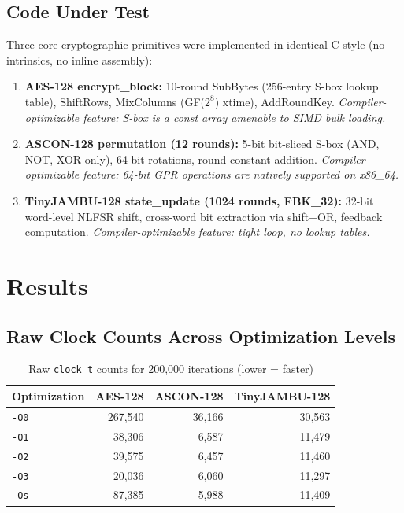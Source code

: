 \documentclass[11pt,a4paper]{article}
\begin{document}
\subsection{Code Under Test}

Three core cryptographic primitives were implemented in identical C style (no intrinsics, no inline assembly):

\begin{enumerate}[label=(\arabic*)]
    \item \textbf{AES-128 encrypt\_block:} 10-round SubBytes (256-entry S-box lookup table), ShiftRows, MixColumns (GF($2^8$) xtime), AddRoundKey. \textit{Compiler-optimizable feature: S-box is a const array amenable to SIMD bulk loading.}
    \item \textbf{ASCON-128 permutation (12 rounds):} 5-bit bit-sliced S-box (AND, NOT, XOR only), 64-bit rotations, round constant addition. \textit{Compiler-optimizable feature: 64-bit GPR operations are natively supported on x86\_64.}
    \item \textbf{TinyJAMBU-128 state\_update (1024 rounds, FBK\_32):} 32-bit word-level NLFSR shift, cross-word bit extraction via shift+OR, feedback computation. \textit{Compiler-optimizable feature: tight loop, no lookup tables.}
\end{enumerate}

\section{Results}

\subsection{Raw Clock Counts Across Optimization Levels}

\begin{table}[H]
\centering
\caption{Raw {\tt clock\_t} counts for 200,000 iterations (lower = faster)}
\label{tab:raw}
\begin{tabular}{lrrr}
\toprule
\textbf{Optimization} & \textbf{AES-128} & \textbf{ASCON-128} & \textbf{TinyJAMBU-128} \\
\midrule
{\tt -O0} & 267,540 & 36,166 & 30,563 \\
{\tt -O1} &  38,306 &  6,587 & 11,479 \\
{\tt -O2} &  39,575 &  6,457 & 11,460 \\
{\tt -O3} &  20,036 &  6,060 & 11,297 \\
{\tt -Os} &  87,385 &  5,988 & 11,409 \\
\bottomrule
\end{tabular}
\end{table}
\end{document}
